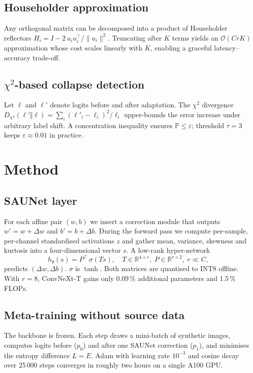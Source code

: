 \documentclass{article}
\begin{document}
\subsection{Householder approximation}
Any orthogonal matrix can be decomposed into a product of Householder reflectors \(H_i = I - 2\,u_i u_i^\top / \lVert u_i \rVert^2\). Truncating after \(K\) terms yields an \(\mathcal{O}(C r K)\) approximation whose cost scales linearly with \(K\), enabling a graceful latency–accuracy trade-off.

\subsection{\texorpdfstring{$\chi^2$}{Chi-squared}-based collapse detection}
Let \(\ell\) and \(\ell'\) denote logits before and after adaptation. The \(\chi^2\) divergence \(D_{\chi^2}(\ell'\Vert\ell) = \sum_i (\ell'_i-\ell_i)^2/\ell_i\) upper-bounds the error increase under arbitrary label shift. A concentration inequality ensures \(\mathbb{P}\leq\varepsilon\); threshold \(\tau=3\) keeps \(\varepsilon \approx 0.01\) in practice.

\section{Method}
\subsection{SAUNet layer}
For each affine pair \((w,b)\) we insert a correction module that outputs \(w' = w + \Delta w\) and \(b' = b + \Delta b\). During the forward pass we compute per-sample, per-channel standardised activations \(z\) and gather mean, variance, skewness and kurtosis into a four-dimensional vector \(s\). A low-rank hyper-network
\[
  h_{\theta}(s) = P^{\top} \, \sigma(Ts), \quad T \in \mathbb{R}^{4\times r},\; P \in \mathbb{R}^{r\times 2},\; r \ll C,
\]
predicts \((\Delta w, \Delta b)\). \(\sigma\) is \(\tanh\). Both matrices are quantised to INT8 offline. With \(r=8\), ConvNeXt-T gains only 0.09\,\% additional parameters and 1.5\,\% FLOPs.

\subsection{Meta-training without source data}
The backbone is frozen. Each step draws a mini-batch of synthetic images, computes logits before (\(p_0\)) and after one SAUNet correction (\(p_1\)), and minimises the entropy difference \(L = E\). Adam with learning rate \(10^{-3}\) and cosine decay over 25\,000 steps converges in roughly two hours on a single A100 GPU.
\end{document}
